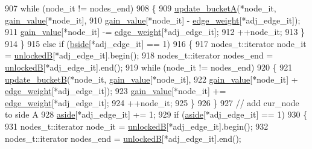 \begin{DoxyCode}
907         \textcolor{keywordflow}{while} (node\_it != nodes\_end)
908         \{
909         \mbox{\hyperlink{classfm__partition_aa4ec83c52916cc6cac23e7a9987427cd}{update\_bucketA}}(*node\_it, \mbox{\hyperlink{classfm__partition_ae8176f4ce82305abfd58e519d2cdd91d}{gain\_value}}[*node\_it],
910             \mbox{\hyperlink{classfm__partition_ae8176f4ce82305abfd58e519d2cdd91d}{gain\_value}}[*node\_it] - \mbox{\hyperlink{classfm__partition_adfe6147ba3f9c785f613b472f950595f}{edge\_weight}}[*adj\_edge\_it]);
911         \mbox{\hyperlink{classfm__partition_ae8176f4ce82305abfd58e519d2cdd91d}{gain\_value}}[*node\_it] -= \mbox{\hyperlink{classfm__partition_adfe6147ba3f9c785f613b472f950595f}{edge\_weight}}[*adj\_edge\_it];
912         ++node\_it;
913         \}
914     \}
915     \textcolor{keywordflow}{else} \textcolor{keywordflow}{if} (\mbox{\hyperlink{classfm__partition_aa75765887173fb06b076b6cae12d4e66}{bside}}[*adj\_edge\_it] == 1)
916     \{
917         nodes\_t::iterator node\_it = \mbox{\hyperlink{classfm__partition_a74865bf3e6b6f73350c43c3ad9dfda96}{unlockedB}}[*adj\_edge\_it].begin();
918         nodes\_t::iterator nodes\_end = \mbox{\hyperlink{classfm__partition_a74865bf3e6b6f73350c43c3ad9dfda96}{unlockedB}}[*adj\_edge\_it].end();
919         \textcolor{keywordflow}{while} (node\_it != nodes\_end)
920         \{
921         \mbox{\hyperlink{classfm__partition_a270d469ca584ed9adff9fced67743679}{update\_bucketB}}(*node\_it, \mbox{\hyperlink{classfm__partition_ae8176f4ce82305abfd58e519d2cdd91d}{gain\_value}}[*node\_it],
922             \mbox{\hyperlink{classfm__partition_ae8176f4ce82305abfd58e519d2cdd91d}{gain\_value}}[*node\_it] + \mbox{\hyperlink{classfm__partition_adfe6147ba3f9c785f613b472f950595f}{edge\_weight}}[*adj\_edge\_it]);
923         \mbox{\hyperlink{classfm__partition_ae8176f4ce82305abfd58e519d2cdd91d}{gain\_value}}[*node\_it] += \mbox{\hyperlink{classfm__partition_adfe6147ba3f9c785f613b472f950595f}{edge\_weight}}[*adj\_edge\_it];
924         ++node\_it;
925         \}
926     \}
927     \textcolor{comment}{// add cur\_node to side A}
928     \mbox{\hyperlink{classfm__partition_a14b0aa9a91a6e7fa3035669cf5056275}{aside}}[*adj\_edge\_it] += 1;
929     \textcolor{keywordflow}{if} (\mbox{\hyperlink{classfm__partition_a14b0aa9a91a6e7fa3035669cf5056275}{aside}}[*adj\_edge\_it] == 1)
930     \{
931         nodes\_t::iterator node\_it = \mbox{\hyperlink{classfm__partition_a74865bf3e6b6f73350c43c3ad9dfda96}{unlockedB}}[*adj\_edge\_it].begin();
932         nodes\_t::iterator nodes\_end = \mbox{\hyperlink{classfm__partition_a74865bf3e6b6f73350c43c3ad9dfda96}{unlockedB}}[*adj\_edge\_it].end();

\end{DoxyCode}
